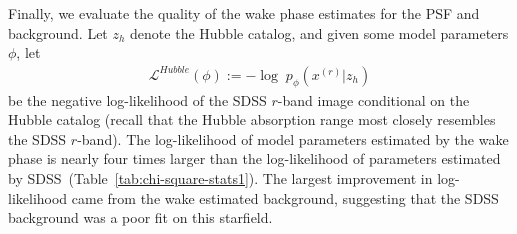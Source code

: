 


Finally, we evaluate the quality of the wake phase estimates for the PSF and background. Let $z_h$ denote the Hubble catalog, and given some model parameters $\phi$, let
\begin{align}
    \mathcal{L}^{Hubble}(\phi) := 
    - \log \; p_\phi(x^{(r)} | z_h)
    \label{eq:hubble_neg_loglik}
\end{align}
be the negative log-likelihood of the SDSS $r$-band image conditional on the Hubble catalog (recall that the Hubble absorption range most closely resembles the SDSS $r$-band). The log-likelihood of model parameters estimated by the wake phase is nearly four times larger than the log-likelihood of parameters estimated by SDSS~(Table~\ref{tab:chi-square-stats1}). 
The largest improvement in log-likelihood came from the wake estimated background, suggesting that the SDSS background was a poor fit on this starfield. 

